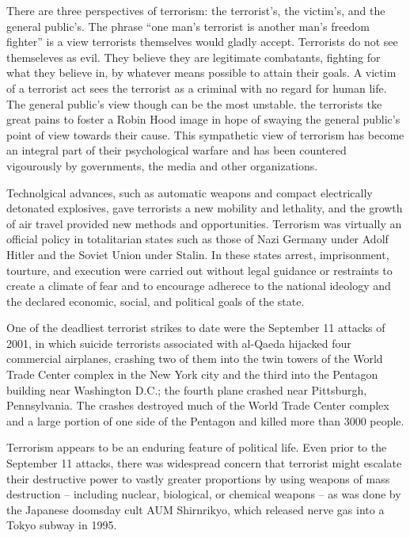 \documentclass[
  openany]{book}
\begin{document}
There are three perspectives of terrorism: the terrorist's, the victim's, and the general public's. The phrase ``one man's terrorist is another man's freedom fighter'' is a view terrorists themselves would gladly accept. Terrorists do not see themseleves as evil. They believe they are legitimate combatants, fighting for what they believe in, by whatever means possible to attain their goals. A victim of a terrorist act sees the terrorist as a criminal with no regard for human life. The general public's view though can be the most unstable. the terrorists tke great pains to foster a Robin Hood image in hope of swaying the general public's point of view towards their cause. This sympathetic view of terrorism has become an integral part of their psychological warfare and has been countered vigourously by governments, the media and other organizations.

Technolgical advances, such as automatic weapons and compact electrically detonated explosives, gave terrorists a new mobility and lethality, and the growth of air travel provided new methods and opportunities. Terrorism was virtually an official policy in totalitarian states such as those of Nazi Germany under Adolf Hitler and the Soviet Union under Stalin. In these states arrest, imprisonment, tourture, and execution were carried out without legal guidance or restraints to create a climate of fear and to encourage adherece to the national ideology and the declared economic, social, and political goals of the state.

One of the deadliest terrorist strikes to date were the September 11 attacks of 2001, in which suicide terrorists associated with al-Qaeda hijacked four commercial airplanes, crashing two of them into the twin towers of the World Trade Center complex in the New York city and the third into the Pentagon building near Washington D.C.; the fourth plane crashed near Pittsburgh, Pennsylvania. The crashes destroyed much of the World Trade Center complex and a large portion of one side of the Pentagon and killed more than 3000 people.

Terrorism appears to be an enduring feature of political life. Even prior to the September 11 attacks, there was widespread concern that terrorist might escalate their destructive power to vastly greater proportions by using weapons of mass destruction -- including nuclear, biological, or chemical weapons -- as was done by the Japanese doomsday cult AUM Shirnrikyo, which released nerve gas into a Tokyo subway in 1995.
\end{document}
